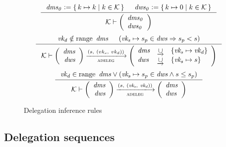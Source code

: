 \begin{figure}[htb]
  \begin{equation}
    \inference
    {
      \var{dms_0} \leteq \Set{k \mapsto k}{k \in \mathcal{K}} &
      \var{dws_0} \leteq \Set{k \mapsto 0}{k \in \mathcal{K}}
    }
    {
      \mathcal{K}
      \vdash
      \left(
        \begin{array}{l}
          \var{dms_0}\\
          \var{dws_0}
        \end{array}
      \right)
    }
  \end{equation}
  \nextdef
  \begin{equation}\label{eq:rule:delegation-change}
    \inference
    {
      \var{vk_d} \notin \range~\var{dms} & (\var{vk_s} \mapsto s_p \in \var{dws} \Rightarrow s_p < s)
    }
    {
      \mathcal{K}
      \vdash
      \left(
      \begin{array}{r}
        \var{dms}\\
        \var{dws}
      \end{array}
      \right)
      \trans{adeleg}{(s,~ (vk_s,~ vk_d))}
      \left(
      \begin{array}{lcl}
        \var{dms} & \unionoverrideRight & \{\var{vk_s} \mapsto \var{vk_d}\}\\
        \var{dws} & \unionoverrideRight & \{\var{vk_s} \mapsto s \}
      \end{array}
      \right)
    }
  \end{equation}
  \nextdef
  \begin{equation}\label{eq:rule:delegation-nop}
    \inference
    {\var{vk_d} \in \range~\var{dms} \vee (\var{vk_s} \mapsto s_p  \in \var{dws}  \wedge s \leq s_p)
    }
    {
      \mathcal{K}
      \vdash
      \left(
      \begin{array}{r}
        \var{dms}\\
        \var{dws}
      \end{array}
      \right)
      \trans{adeleg}{(s,~ (\var{vk_s},~ \var{vk_d}))}
      \left(
      \begin{array}{lcl}
        \var{dms}\\
        \var{dws}
      \end{array}
      \right)
    }
  \end{equation}
  \caption{Delegation inference rules}
  \label{fig:rules:delegation}
\end{figure}

\clearpage

\subsection{Delegation sequences}
\label{sec:delegation-sequences}


